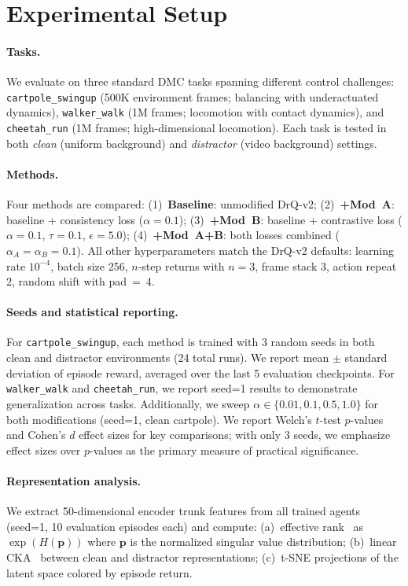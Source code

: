 \documentclass{article}
\begin{document}
\section{Experimental Setup}
\label{sec:setup}

\paragraph{Tasks.}
We evaluate on three standard DMC tasks spanning different control challenges:
\texttt{cartpole\_swingup} (500K environment frames; balancing with underactuated dynamics),
\texttt{walker\_walk} (1M frames; locomotion with contact dynamics), and
\texttt{cheetah\_run} (1M frames; high-dimensional locomotion).
Each task is tested in both \emph{clean} (uniform background) and \emph{distractor} (video background) settings.

\paragraph{Methods.}
Four methods are compared:
(1)~\textbf{Baseline}: unmodified DrQ-v2;
(2)~\textbf{+Mod~A}: baseline + consistency loss ($\alpha=0.1$);
(3)~\textbf{+Mod~B}: baseline + contrastive loss ($\alpha=0.1$, $\tau=0.1$, $\epsilon=5.0$);
(4)~\textbf{+Mod~A+B}: both losses combined ($\alpha_A=\alpha_B=0.1$).
All other hyperparameters match the DrQ-v2 defaults: learning rate $10^{-4}$, batch size 256, $n$-step returns with $n=3$, frame stack 3, action repeat 2, random shift with pad~=~4.

\paragraph{Seeds and statistical reporting.}
For \texttt{cartpole\_swingup}, each method is trained with 3 random seeds in both clean and distractor environments (24 total runs).
We report mean $\pm$ standard deviation of episode reward, averaged over the last 5 evaluation checkpoints.
For \texttt{walker\_walk} and \texttt{cheetah\_run}, we report seed=1 results to demonstrate generalization across tasks.
Additionally, we sweep $\alpha \in \{0.01, 0.1, 0.5, 1.0\}$ for both modifications (seed=1, clean cartpole).
We report Welch's $t$-test $p$-values and Cohen's $d$ effect sizes for key comparisons; with only 3 seeds, we emphasize effect sizes over $p$-values as the primary measure of practical significance.

\paragraph{Representation analysis.}
We extract 50-dimensional encoder trunk features from all trained agents (seed=1, 10 evaluation episodes each) and compute:
(a)~effective rank~\citep{kumar2020implicit} as $\exp(H(\mathbf{p}))$ where $\mathbf{p}$ is the normalized singular value distribution;
(b)~linear CKA~\citep{kornblith2019similarity} between clean and distractor representations;
(c)~t-SNE projections of the latent space colored by episode return.
\end{document}
